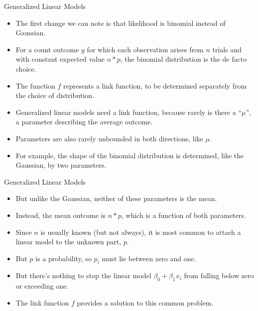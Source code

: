 \documentclass[handout]{beamer}
\begin{document}
\begin{frame}{Generalized Linear Models}
\scriptsize{
\begin{itemize}


\item  The first change we can note is that likelihood is binomial instead of Gaussian.
\item For a count outcome $y$ for which each observation arises from $n$ trials and with constant expected value $n*p$, the binomial distribution is the de facto choice.

\item The function $f$ represents a link function, to be determined separately from the choice of distribution.

\item Generalized linear models need a link function, because rarely is there a ``$\mu$'', a parameter describing the average outcome.
\item Parameters are also rarely unbounded in both directions, like $\mu$.
\item For example, the shape of the binomial distribution is determined, like the Gaussian, by two parameters.
\end{itemize}



}

\end{frame}


\begin{frame}{Generalized Linear Models}
\scriptsize{
\begin{itemize}

\item But unlike the Gaussian, neither of these parameters is the mean.
\item Instead, the mean outcome is $n*p$, which is a function of both parameters.
\item Since $n$ is usually known (but not always), it is most common to attach a linear model to the unknown part, $p$.
\item But $p$ is a probability, so $p_i$ must lie between zero and one.
\item But there's nothing to stop the linear model $\beta_0 + \beta_1 x_i$ from falling below zero or exceeding one.
\item The link function $f$ provides a solution to this common problem.

\end{itemize}



}

\end{frame}
\end{document}
